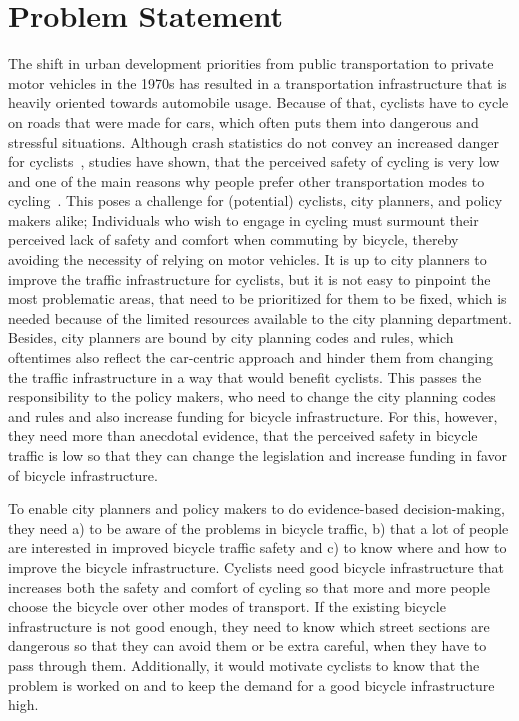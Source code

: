 \section{Problem Statement}
\label{sec:problem}
The shift in urban development priorities from public transportation to private motor vehicles in the 1970s has resulted in a transportation infrastructure that is heavily oriented towards automobile usage.
Because of that, cyclists have to cycle on roads that were made for cars, which often puts them into dangerous and stressful situations.
Although crash statistics do not convey an increased danger for cyclists~\cite{juhra2012bicycle}, studies have shown, that the perceived safety of cycling is very low and one of the main reasons why people prefer other transportation modes to cycling~\cite{horton2016fear}.
This poses a challenge for (potential) cyclists, city planners, and policy makers alike;
Individuals who wish to engage in cycling must surmount their perceived lack of safety and comfort when commuting by bicycle, thereby avoiding the necessity of relying on motor vehicles. 
It is up to city planners to improve the traffic infrastructure for cyclists, but it is not easy to pinpoint the most problematic areas, that need to be prioritized for them to be fixed, which is needed because of the limited resources available to the city planning department.
Besides, city planners are bound by city planning codes and rules, which oftentimes also reflect the car-centric approach and hinder them from changing the traffic infrastructure in a way that would benefit cyclists.
This passes the responsibility to the policy makers, who need to change the city planning codes and rules and also increase funding for bicycle infrastructure.
For this, however, they need more than anecdotal evidence, that the perceived safety in bicycle traffic is low so that they can change the legislation and increase funding in favor of bicycle infrastructure.

To enable city planners and policy makers to do evidence-based decision-making, they need a) to be aware of the problems in bicycle traffic, b) that a lot of people are interested in improved bicycle traffic safety and c) to know where and how to improve the bicycle infrastructure.
Cyclists need good bicycle infrastructure that increases both the safety and comfort of cycling so that more and more people choose the bicycle over other modes of transport.
If the existing bicycle infrastructure is not good enough, they need to know which street sections are dangerous so that they can avoid them or be extra careful, when they have to pass through them.
Additionally, it would motivate cyclists to know that the problem is worked on and to keep the demand for a good bicycle infrastructure high. 

